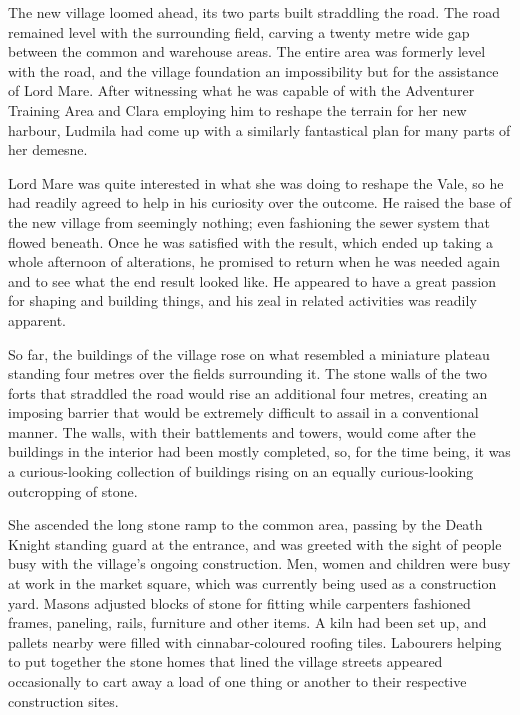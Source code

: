  

The new village loomed ahead, its two parts built straddling the road. The road remained level with the surrounding field, carving a twenty metre wide gap between the common and warehouse areas. The entire area was formerly level with the road, and the village foundation an impossibility but for the assistance of Lord Mare. After witnessing what he was capable of with the Adventurer Training Area and Clara employing him to reshape the terrain for her new harbour, Ludmila had come up with a similarly fantastical plan for many parts of her demesne.

 

Lord Mare was quite interested in what she was doing to reshape the Vale, so he had readily agreed to help in his curiosity over the outcome. He raised the base of the new village from seemingly nothing; even fashioning the sewer system that flowed beneath. Once he was satisfied with the result, which ended up taking a whole afternoon of alterations, he promised to return when he was needed again and to see what the end result looked like. He appeared to have a great passion for shaping and building things, and his zeal in related activities was readily apparent.

 

So far, the buildings of the village rose on what resembled a miniature plateau standing four metres over the fields surrounding it. The stone walls of the two forts that straddled the road would rise an additional four metres, creating an imposing barrier that would be extremely difficult to assail in a conventional manner. The walls, with their battlements and towers, would come after the buildings in the interior had been mostly completed, so, for the time being, it was a curious-looking collection of buildings rising on an equally curious-looking outcropping of stone.

 

She ascended the long stone ramp to the common area, passing by the Death Knight standing guard at the entrance, and was greeted with the sight of people busy with the village’s ongoing construction. Men, women and children were busy at work in the market square, which was currently being used as a construction yard. Masons adjusted blocks of stone for fitting while carpenters fashioned frames, paneling, rails, furniture and other items. A kiln had been set up, and pallets nearby were filled with cinnabar-coloured roofing tiles. Labourers helping to put together the stone homes that lined the village streets appeared occasionally to cart away a load of one thing or another to their respective construction sites.

